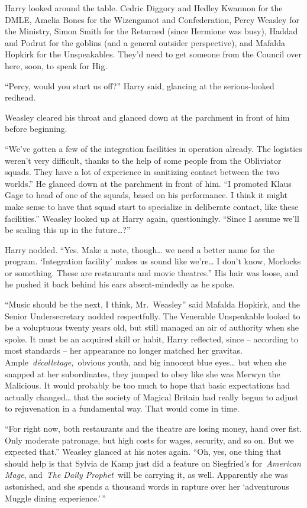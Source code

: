 Harry looked around the table. Cedric Diggory and Hedley Kwannon for the
DMLE, Amelia Bones for the Wizengamot and Confederation, Percy Weasley
for the Ministry, Simon Smith for the Returned (since Hermione was
busy), Haddad and Podrut for the goblins (and a general outsider
perspective), and Mafalda Hopkirk for the Unspeakables. They'd need to
get someone from the Council over here, soon, to speak for Hig.

``Percy, would you start us off?'' Harry said, glancing at the
serious-looked redhead.

Weasley cleared his throat and glanced down at the parchment in front of
him before beginning.

``We've gotten a few of the integration facilities in operation already.
The logistics weren't very difficult, thanks to the help of some people
from the Obliviator squads. They have a lot of experience in sanitizing
contact between the two worlds.'' He glanced down at the parchment in
front of him. ``I promoted Klaus Gage to head of one of the squads,
based on his performance. I think it might make sense to have that squad
start to specialize in deliberate contact, like these facilities.''
Weasley looked up at Harry again, questioningly. ``Since I assume we'll
be scaling this up in the future\ldots?''

Harry nodded. ``Yes. Make a note, though\ldots{} we need a better name
for the program. `Integration facility' makes us sound like
we're\ldots{} I don't know, Morlocks or something. These are restaurants
and movie theatres.'' His hair was loose, and he pushed it back behind
his ears absent-mindedly as he spoke.

``Music should be the next, I think, Mr.~Weasley'' said Mafalda Hopkirk,
and the Senior Undersecretary nodded respectfully. The Venerable
Unspeakable looked to be a voluptuous twenty years old, but still
managed an air of authority when she spoke. It must be an acquired skill
or habit, Harry reflected, since -- according to most standards -- her
appearance no longer matched her gravitas.
Ample~\emph{décolletage,}~obvious youth, and big innocent blue
eyes\ldots{} but when she snapped at her subordinates, they jumped to
obey like she was Merwyn the Malicious. It would probably be too much to
hope that basic expectations had actually changed\ldots{} that the
society of Magical Britain had really begun to adjust to rejuvenation in
a fundamental way. That would come in time.

``For right now, both restaurants and the theatre are losing money, hand
over fist. Only moderate patronage, but high costs for wages, security,
and so on. But we expected that.'' Weasley glanced at his notes again.
``Oh, yes, one thing that should help is that Sylvia de Kamp just did a
feature on Siegfried's for~\emph{American Mage}, and~\emph{The Daily
Prophet}~will be carrying it, as well. Apparently she was astonished,
and she spends a thousand words in rapture over her `adventurous Muggle
dining experience.'\,''


